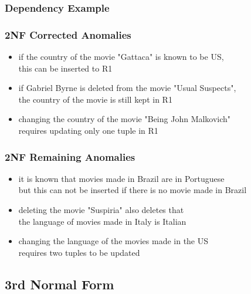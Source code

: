 \documentclass[dvipsnames]{beamer}
\begin{document}
\begin{frame}
  \frametitle{Dependency Example}

  \begin{center}
  \end{center}
\end{frame}

\begin{frame}
  \frametitle{2NF Corrected Anomalies}

  \begin{itemize}
    \item if the country of the movie "Gattaca" is known to be US,\\
      this can be inserted to R1

    \pause
    \medskip
    \item if Gabriel Byrne is deleted from the movie "Usual Suspects",\\
      the country of the movie is still kept in R1

    \pause
    \medskip
    \item changing the country of the movie "Being John Malkovich"\\
      requires updating only one tuple in R1
  \end{itemize}
\end{frame}

\begin{frame}
  \frametitle{2NF Remaining Anomalies}

  \begin{itemize}
    \item it is known that movies made in Brazil are in Portuguese\\
      but this can not be inserted if there is no movie made in Brazil

    \pause
    \medskip
    \item deleting the movie "Suspiria" also deletes that\\
      the language of movies made in Italy is Italian

    \pause
    \medskip
    \item changing the language of the movies made in the US\\
      requires two tuples to be updated
  \end{itemize}
\end{frame}

\subsection{3rd Normal Form}
\end{document}
